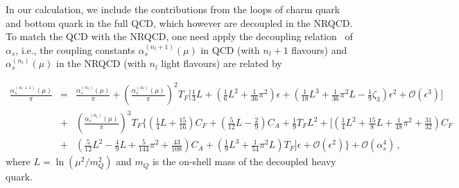 \documentclass[onecolumn,preprintnumbers,aps,superscriptaddress,nofootinbib,prd,notitlepage]{revtex4-1}
\newcommand{\beq}{\begin{eqnarray}}
\newcommand{\eeq}{\end{eqnarray}}
\newcommand{\non}{\nonumber\\ }
\begin{document}
In our calculation, we include the contributions from the loops of charm quark and bottom quark in the full QCD, which however are decoupled in the NRQCD.
To match the QCD with the NRQCD, one need apply the decoupling relation~\cite{Chetyrkin:2005ia,Bernreuther:1981sg,Barnreuther:2013qvf,Grozin:2007fh,Ozcelik:2021zqt} of $\alpha_s$, i.e., the coupling constants
$\alpha_s^{(n_l+1)}(\mu)$ in QCD (with $n_l+1$ flavours) and $\alpha_s^{(n_l)}(\mu)$ in the NRQCD (with $n_l$ light flavours) are related by~\cite{Grozin:2007fh}
{\small
\beq
\frac{\alpha_s^{(n_l+1)}(\mu)}{\pi} &=& \frac{\alpha_s^{(n_l)}(\mu)}{\pi} + \left( \frac{\alpha_s^{(n_l)}(\mu)}{\pi} \right)^2 T_F \bigg[ \frac{1}{3} L + \left( \frac{1}{6} L^2 + \frac{1}{36} \pi^2 \right) \epsilon
+ \left( \frac{1}{18} L^3 + \frac{1}{36} \pi^2 L - \frac{1}{9} \zeta_3 \right) \epsilon^2 + \mathcal{O}{(\epsilon^3)} \bigg]\non
&+& \left( \frac{\alpha_s^{(n_l)}(\mu)}{\pi} \right)^3 T_F \bigg\{ \left( \frac{1}{4} L +\frac{15}{16} \right) C_F + \left( \frac{5}{12} L - \frac{2}{9} \right) C_A
+ \frac{1}{9} T_F L^2 + \bigg[ \left( \frac{1}{4} L^2 + \frac{15}{8} L + \frac{1}{48} \pi^2 + \frac{31}{32} \right) C_F \non
&+&  \left( \frac{5}{12} L^2 - \frac{4}{9} L + \frac{5}{144} \pi^2 + \frac{43}{108} \right) C_A + \left( \frac{1}{9} L^3 + \frac{1}{54} \pi^2 L \right) T_F \bigg] \epsilon
+ \mathcal{O}{(\epsilon^2)} \bigg\} + \mathcal{O}{(\alpha_s^4)}\,, \label{eq:alphasnlp1}
\eeq
where $L =\ln(\mu^2/m_Q^2)$ and $m_Q$ is the on-shell mass of the decoupled heavy quark.


}
\end{document}
